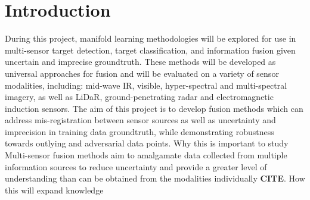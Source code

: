 \chapter{Introduction}

During this project, manifold learning methodologies will be explored for use in multi-sensor target detection, target classification, and information fusion given uncertain and imprecise groundtruth.  These methods will be developed as universal approaches for fusion and will be evaluated on a variety of sensor modalities, including: mid-wave IR, visible, hyper-spectral and multi-spectral imagery, as well as LiDaR, ground-penetrating radar and electromagnetic induction sensors.  The aim of this project is to develop fusion methods which can address mis-registration between sensor sources as well as uncertainty and imprecision in training data groundtruth, while demonstrating robustness towards outlying and adversarial data points. \newline
Why this is important to study
\newline
Multi-sensor fusion methods aim to amalgamate data collected from multiple information sources to reduce uncertainty and provide a greater level of understanding than can be obtained from the modalities individually \textbf{CITE}.  \newline
How this will expand knowledge
